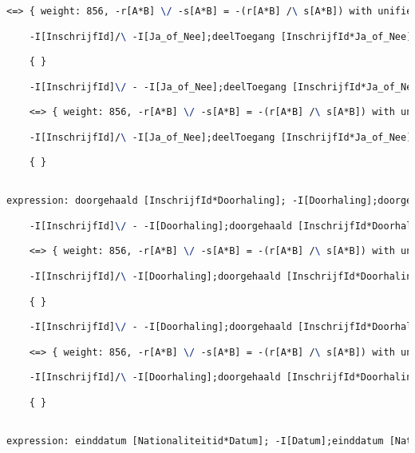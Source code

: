 \begin{lstlisting}[language=TeX]
    <=> { weight: 856, -r[A*B] \/ -s[A*B] = -(r[A*B] /\ s[A*B]) with unifier: {A->I[InschrijfId], B->I[InschrijfId], r->deelToegang [InschrijfId*Ja_of_Nee];-I[Ja_of_Nee];deelToegang [InschrijfId*Ja_of_Nee]~, s->I[InschrijfId]} }

    -I[InschrijfId]/\ -I[Ja_of_Nee];deelToegang [InschrijfId*Ja_of_Nee]~;deelToegang [InschrijfId*Ja_of_Nee]

    { }

    -I[InschrijfId]\/ - -I[Ja_of_Nee];deelToegang [InschrijfId*Ja_of_Nee]~;deelToegang [InschrijfId*Ja_of_Nee]

    <=> { weight: 856, -r[A*B] \/ -s[A*B] = -(r[A*B] /\ s[A*B]) with unifier: {A->I[InschrijfId], B->I[InschrijfId], r->I[InschrijfId], s->deelToegang [InschrijfId*Ja_of_Nee];-I[Ja_of_Nee];deelToegang [InschrijfId*Ja_of_Nee]~} }

    -I[InschrijfId]/\ -I[Ja_of_Nee];deelToegang [InschrijfId*Ja_of_Nee]~;deelToegang [InschrijfId*Ja_of_Nee]

    { }


expression: doorgehaald [InschrijfId*Doorhaling]; -I[Doorhaling];doorgehaald [InschrijfId*Doorhaling]~ |- -I[InschrijfId]

    -I[InschrijfId]\/ - -I[Doorhaling];doorgehaald [InschrijfId*Doorhaling]~;doorgehaald [InschrijfId*Doorhaling]

    <=> { weight: 856, -r[A*B] \/ -s[A*B] = -(r[A*B] /\ s[A*B]) with unifier: {A->I[InschrijfId], B->I[InschrijfId], r->doorgehaald [InschrijfId*Doorhaling];-I[Doorhaling];doorgehaald [InschrijfId*Doorhaling]~, s->I[InschrijfId]} }

    -I[InschrijfId]/\ -I[Doorhaling];doorgehaald [InschrijfId*Doorhaling]~;doorgehaald [InschrijfId*Doorhaling]

    { }

    -I[InschrijfId]\/ - -I[Doorhaling];doorgehaald [InschrijfId*Doorhaling]~;doorgehaald [InschrijfId*Doorhaling]

    <=> { weight: 856, -r[A*B] \/ -s[A*B] = -(r[A*B] /\ s[A*B]) with unifier: {A->I[InschrijfId], B->I[InschrijfId], r->I[InschrijfId], s->doorgehaald [InschrijfId*Doorhaling];-I[Doorhaling];doorgehaald [InschrijfId*Doorhaling]~} }

    -I[InschrijfId]/\ -I[Doorhaling];doorgehaald [InschrijfId*Doorhaling]~;doorgehaald [InschrijfId*Doorhaling]

    { }


expression: einddatum [Nationaliteitid*Datum]; -I[Datum];einddatum [Nationaliteitid*Datum]~ |- -I[Nationaliteitid]


\end{lstlisting}
